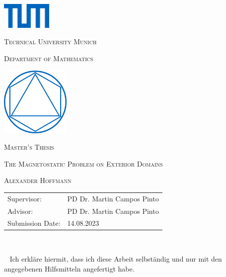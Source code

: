 \documentclass[12pt,a4paper,times]{report}
\numberwithin{equation}{section}
\numberwithin{figure}{section}
\numberwithin{lemma}{section}
\theoremstyle{definition}
\begin{document}
\begin{titlepage}
    \begin{center}
    \includegraphics[width=0.18\textwidth]{img/tum.png}\par
    \vspace{0.5cm}
    {\scshape\LARGE Technical University Munich \par}
    \vspace{0.5cm}
    {\scshape \Large Department of Mathematics\par}
    \vspace{1cm}
	\includegraphics[width=0.25\textwidth]{img/ma_tum.png}\par
    \vspace{0.5cm}
    {\scshape \LARGE Master's Thesis \par}
    \vspace{0.6cm}
   {\Huge \scshape The Magnetostatic Problem on Exterior Domains \par}
   \vspace{0.7cm}
   
   {\scshape \Large Alexander Hoffmann\par}
   

	\end{center}
	\vfill
    \begin{tabular}{ll}
    Supervisor:& PD Dr. Martin Campos Pinto\\
    \noindent Advisor:& PD Dr. Martin Campos Pinto\\
    \noindent Submission Date:& 14.08.2023\\
    \end{tabular}
    \vspace{1cm}
\end{titlepage}
\
\thispagestyle{empty}
\newpage

\ {}
\vfill
\thispagestyle{empty}
\noindent Ich erkläre hiermit, dass ich diese Arbeit selbständig und nur mit den angegebenen Hilfsmitteln angefertigt habe.
\medskip
\end{document}
